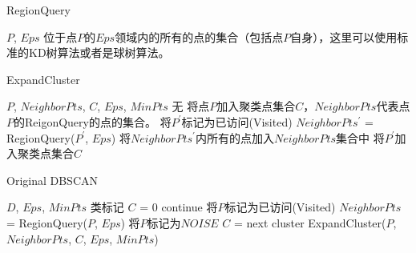 \documentclass[UTF8, 12pt]{ctexart}
\begin{document}
\begin{algorithm}[H]
	\caption{RegionQuery}
	\label{alg1}
	\begin{algorithmic}[1]
		\REQUIRE $P$, $Eps$
		\ENSURE 位于点$P$的$Eps$领域内的所有的点的集合（包括点$P$自身），这里可以使用标准的KD树算法或者是球树算法。
	\end{algorithmic}
\end{algorithm}

\begin{algorithm}[H]
	\caption{ExpandCluster}
	\label{alg2}
	\begin{algorithmic}[1]
		\REQUIRE $P$, $NeighborPts$, $C$, $Eps$, $MinPts$
		\ENSURE 无
		\STATE 将点$P$加入聚类点集合$C$，$NeighborPts$代表点$P$的ReigonQuery的点的集合。
		\STATE 将$P^{'}$标记为已访问(Visited)
		\STATE $NeighborPts^{'}$ = RegionQuery($P^{'}$, $Eps$)
		\STATE 将$NeighborPts^{'}$内所有的点加入$NeighborPts$集合中
		\ENDIF
		\ENDIF
		\STATE 将$P^{'}$加入聚类点集合$C$
		\ENDIF
		\ENDFOR
	\end{algorithmic}
\end{algorithm}

\begin{algorithm}[H]
	\caption{Original DBSCAN}
	\label{alg3}
	\begin{algorithmic}[1]
		\REQUIRE $D$, $Eps$, $MinPts$
		\ENSURE 类标记
		\STATE $C$ = 0
				\STATE continue
			\ENDIF
			\STATE 将$P$标记为已访问(Visited)
			\STATE $NeighborPts$ = RegionQuery($P$, $Eps$)
				\STATE 将$P$标记为$NOISE$
			\ELSE
				\STATE $C$ = next cluster
				\STATE ExpandCluster($P$, $NeighborPts$, $C$, $Eps$, $MinPts$)
			\ENDIF
		\ENDFOR
	\end{algorithmic}
\end{algorithm}
\end{document}
